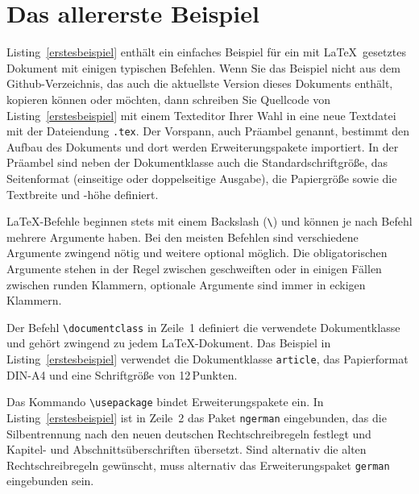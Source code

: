 \documentclass[a4paper,10pt,twoside]{scrbook}
\begin{document}
\section{Das allererste Beispiel}

Listing~\ref{erstesbeispiel} enthält ein einfaches Beispiel für ein mit \LaTeX\ gesetztes Dokument mit einigen typischen Befehlen. Wenn Sie das Beispiel nicht aus dem Github-Verzeichnis, das auch die aktuellste Version dieses Dokuments enthält, kopieren können oder möchten, dann schreiben Sie Quellcode von Listing~\ref{erstesbeispiel} mit einem Texteditor Ihrer Wahl in eine neue Textdatei mit der Dateiendung \verb!.tex!. Der Vorspann, auch Präambel genannt, bestimmt den Aufbau des Dokuments und dort werden Erweiterungspakete importiert. In der Präambel sind neben der Dokumentklasse auch die Standardschriftgröße, das Seitenformat (einseitige oder doppelseitige Ausgabe), die Papiergröße sowie die Textbreite und -höhe definiert.








LaTeX-Befehle\label{Seite_Befehl} beginnen stets mit einem Backslash (\verb!\!) und können je nach Befehl mehrere Argumente haben. Bei den meisten Befehlen sind verschiedene Argumente zwingend nötig und weitere optional möglich. Die obligatorischen Argumente stehen in der Regel zwischen geschweiften oder in einigen Fällen zwischen runden Klammern, optionale Argumente sind immer in eckigen Klammern.

Der Befehl \verb!\documentclass! in Zeile~1 definiert die verwendete Dokumentklasse und gehört zwingend zu jedem LaTeX-Dokument. Das Beispiel in Listing~\ref{erstesbeispiel} verwendet die Dokumentklasse \verb!article!, das Papierformat DIN-A4 und eine Schriftgröße von 12\,Punkten.

Das Kommando \verb!\usepackage! bindet Erweiterungspakete ein. In Listing~\ref{erstesbeispiel} ist  in Zeile~2 das Paket \verb!ngerman! eingebunden, das die Silbentrennung nach den neuen deutschen Rechtschreibregeln festlegt und Kapitel- und Abschnittsüberschriften übersetzt. Sind alternativ die alten Rechtschreibregeln gewünscht, muss alternativ das Erweiterungspaket \verb!german! eingebunden sein.
\end{document}
